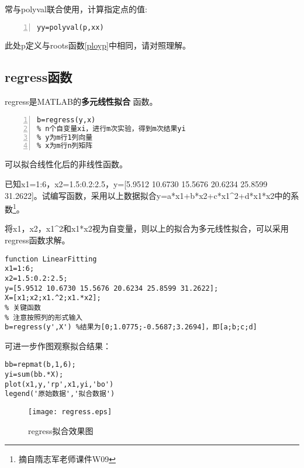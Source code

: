 常与polyval联合使用，计算指定点的值:
\begin{lstlisting}[frame=single,numbers=left]
% 调用格式
yy=polyval(p,xx)
\end{lstlisting}

\begin{note}
此处p定义与roots函数\ref{ployp}中相同，请对照理解。
\end{note}
\subsection{regress函数}
regress是MATLAB的\textcolor{third}{\textbf{多元线性拟合 }}函数。
\begin{lstlisting}[frame=single,numbers=left]
% 调用格式
b=regress(y,x)
% n个自变量xi，进行m次实验，得到m次结果yi
% y为m行1列向量
% x为m行n列矩阵
\end{lstlisting}

\begin{note}
可以拟合线性化后的非线性函数。
\end{note}

\newpage

\begin{problem}\label{problemRegress}
已知x1=1:6，x2=1.5:0.2:2.5，y=[5.9512 10.6730 15.5676 20.6234 25.8599 31.2622]。试编写函数，采用以上数据拟合y=a*x1+b*x2+c*x1\^{}2+d*x1*x2中的系数\footnote{摘自隋志军老师课件W09}。
\end{problem}

\begin{solution}
将x1，x2，x1\^{}2和x1*x2视为自变量，则以上的拟合为多元线性拟合，可以采用regress函数求解。
\begin{lstlisting}
function LinearFitting
x1=1:6;
x2=1.5:0.2:2.5;
y=[5.9512 10.6730 15.5676 20.6234 25.8599 31.2622];
X=[x1;x2;x1.^2;x1.*x2];
% 关键函数
% 注意按照列的形式输入
b=regress(y',X') %结果为[0;1.0775;-0.5687;3.2694]，即[a;b;c;d]
\end{lstlisting}

可进一步作图观察拟合结果：
\begin{lstlisting}
bb=repmat(b,1,6);
yi=sum(bb.*X);
plot(x1,y,'rp',x1,yi,'bo')
legend('原始数据','拟合数据')
\end{lstlisting}

\begin{figure}[htbp]
\centering
\texttt{[image: regress.eps]}
\caption{regress拟合效果图}
\end{figure}
\end{solution}

